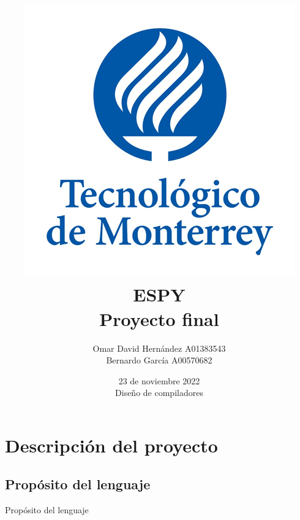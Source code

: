 \documentclass[12pt,letterpaper, titlepage, onecolumn]{article}
\begin{document}
\begin{titlepage}
    \title{\vspace{-5.0cm}\includegraphics{img/logoTec}\\
    {\Huge ESPY} \\
	Proyecto final}    
    
    \author{Omar David Hernández     A01383543
    \\
    Bernardo García     A00570682}
    
    \date {23 de noviembre 2022 \\ Diseño de compiladores}
\end{titlepage}

 
\maketitle

\tableofcontents
\newpage
\justify

\section{Descripción del proyecto}
	\subsection{Propósito del lenguaje}
	Propósito del lenguaje
\end{document}
